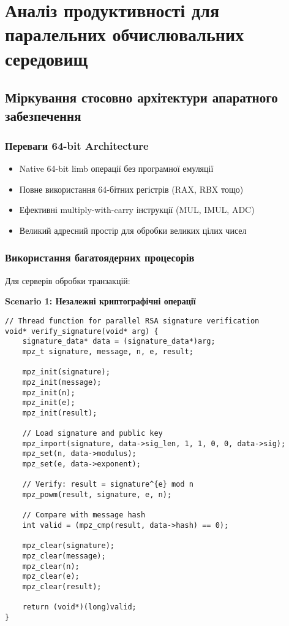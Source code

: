 \newpage
\section{Аналіз продуктивності для паралельних обчислювальних середовищ}

\subsection{Міркування стосовно архітектури апаратного забезпечення}

\subsubsection{Переваги 64-bit Architecture}
\begin{itemize}
    \item Native 64-bit limb операції без програмної емуляції
    \item Повне використання 64-бітних регістрів (RAX, RBX тощо)
    \item Ефективні multiply-with-carry інструкції (MUL, IMUL, ADC)
    \item Великий адресний простір для обробки великих цілих чисел
\end{itemize}

\subsubsection{Використання багатоядерних процесорів}
Для серверів обробки транзакцій:

\textbf{Scenario 1: Незалежні криптографічні операції}
\begin{verbatim}
// Thread function for parallel RSA signature verification
void* verify_signature(void* arg) {
    signature_data* data = (signature_data*)arg;
    mpz_t signature, message, n, e, result;
    
    mpz_init(signature);
    mpz_init(message);
    mpz_init(n);
    mpz_init(e);
    mpz_init(result);
    
    // Load signature and public key
    mpz_import(signature, data->sig_len, 1, 1, 0, 0, data->sig);
    mpz_set(n, data->modulus);
    mpz_set(e, data->exponent);
    
    // Verify: result = signature^{e} mod n
    mpz_powm(result, signature, e, n);
    
    // Compare with message hash
    int valid = (mpz_cmp(result, data->hash) == 0);
    
    mpz_clear(signature);
    mpz_clear(message);
    mpz_clear(n);
    mpz_clear(e);
    mpz_clear(result);
    
    return (void*)(long)valid;
}
\end{verbatim}

